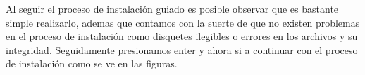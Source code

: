\documentclass[paper=a4, fontsize=12pt]{article} 		%
\numberwithin{equation}{section}						%
\numberwithin{table}{section} 							%
\begin{document}
\begin{figure}[H]
 	\centering
\end{figure}
Al seguir el proceso de instalación guiado es posible observar que es bastante simple realizarlo, ademas que contamos con la suerte de que no existen problemas en el proceso de instalación como disquetes ilegibles o errores en los archivos y su integridad. 
Seguidamente presionamos enter y ahora si a continuar con el proceso de instalación como se ve en las figuras.
\end{document}
